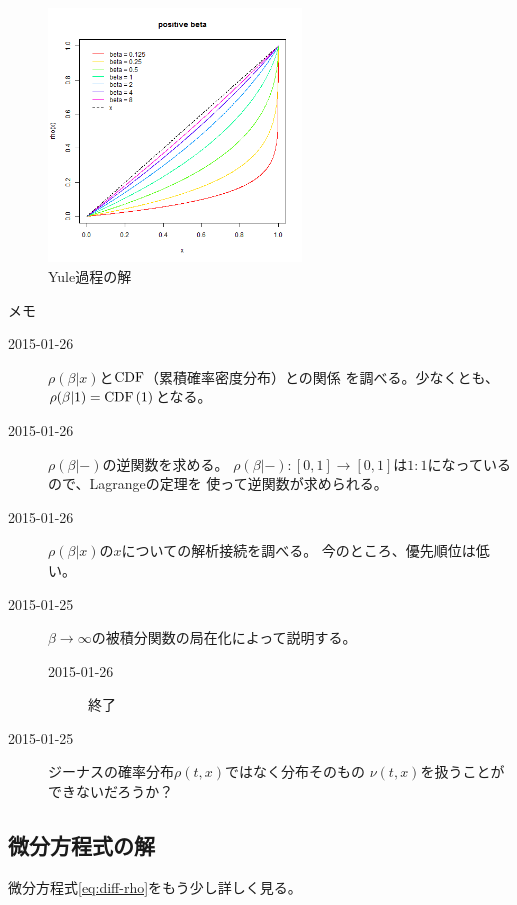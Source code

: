 \begin{figure}[htbp] %
	\begin{center}
		\includegraphics[width=0.6\textwidth]{fig/yule-beta.png}
	\end{center}
	\caption{Yule過程の解}\label{fig:Yule過程の解}
\end{figure} %

\begin{todo}[今後の予定]\label{todo:今後の予定} %
	メモ
	\begin{description} %
		\item[2015-01-26] $\rho(\beta|x)$と$\mathinner{\operatorname{CDF}}$（累積確率密度分布）との関係
		を調べる。少なくとも、$\rho(\beta|1)=\mathinner{\operatorname{CDF}}(1)$となる。
		\item[2015-01-26] $\rho(\beta|-)$の逆関数を求める。
		$\rho(\beta|-):[0,1]\to[0,1]$は$1:1$になっているので、Lagrangeの定理を
		使って逆関数が求められる。
		\item[2015-01-26] $\rho(\beta|x)$の$x$についての解析接続を調べる。
		今のところ、優先順位は低い。
		\item[2015-01-25] $\beta\to\infty$の被積分関数の局在化によって説明する。
		\begin{description} %
			\item[2015-01-26] 終了
		\end{description} %
		\item[2015-01-25] ジーナスの確率分布$\rho(t,x)$ではなく分布そのもの
		$\nu(t,x)$を扱うことができないだろうか？
	\end{description} %
	\EOP
\end{todo} %
\subsection{微分方程式の解}\label{s2:微分方程式の解} %
微分方程式\eqref{eq:diff-rho}をもう少し詳しく見る。

